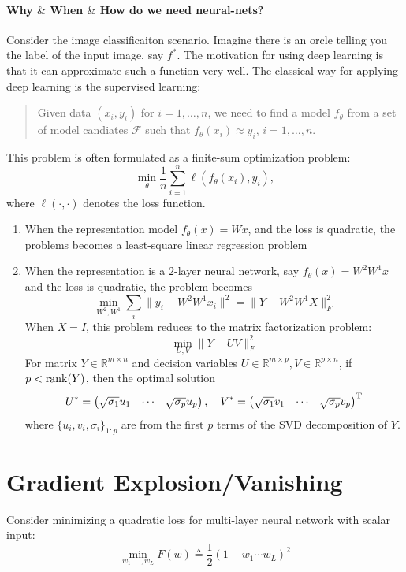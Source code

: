 \paragraph{Why $\&$ When $\&$ How do we need neural-nets?}
Consider the image classificaiton scenario. 
Imagine there is an orcle telling you the label of the input image, say $f^*$.
The motivation for using deep learning is that it can approximate such a function very well.
The classical way for applying deep learning is the supervised learning:
\begin{quotation}
Given data $(x_i,y_i)$ for $i=1,\dots,n$, we need to find a model $f_\theta$ from a set of model candiates $\mathcal{F}$ such that $f_\theta(x_i)\approx y_i$, $i=1,\dots,n$.
\end{quotation}
This problem is often formulated as a finite-sum optimization problem:
\[
\min_\theta\frac{1}{n}\sum_{i=1}^n\ell(f_{\theta}(x_i),y_i),
\]
where $\ell(\cdot,\cdot)$ denotes the loss function.
\begin{enumerate}
\item
When the representation model $f_\theta(x)=Wx$, and the loss is quadratic, the problems becomes a least-square linear regression problem
\item
 When the representation is a $2$-layer neural network, say $f_\theta(x)=W^2W^1x$ and the loss is quadratic, the problem becomes
 \[
 \min_{W^2,W^1}\sum_{i}\|y_i-W^2W^1x_i\|^2 = \|Y-W^2W^1X\|_F^2
 \]
 When $X=I$, this problem reduces to the matrix factorization problem:
 \begin{equation}
\min_{U,V}\|Y-UV\|_F^2
\end{equation}
For matrix $Y\in \mathbb{R}^{m\times n}$ and decision variables $U\in\mathbb{R}^{m\times p},V\in\mathbb{R}^{p\times n}$, if $p<\operatorname{rank}(Y)$, then the optimal solution
\[
U^*=\begin{pmatrix}
\sqrt{\sigma_1}u_1&\cdots&\sqrt{\sigma_p}u_p
\end{pmatrix},\quad
V^*=\begin{pmatrix}
\sqrt{\sigma_1}v_1&\cdots&\sqrt{\sigma_p}v_p
\end{pmatrix}^{\mathrm T}
\]
where $\{u_i,v_i,\sigma_i\}_{1:p}$ are from the first $p$ terms of the SVD decomposition of $Y$.

\end{enumerate}

\section{Gradient Explosion/Vanishing}\label{sec:1:4}
Consider minimizing a quadratic loss for multi-layer neural network with scalar input:
\[
\min_{w_1,\dots,w_L}F(w)\triangleq\frac{1}{2}(1-w_1\cdots w_L)^2
\]
